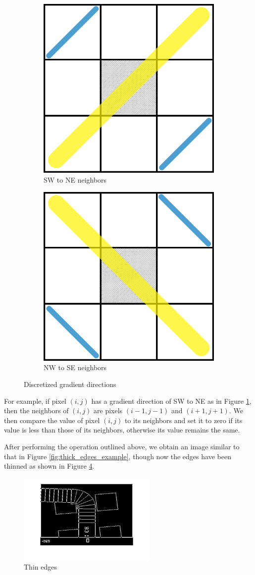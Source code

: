 \begin{figure}[h!]
\centering
\begin{subfigure}{.5\textwidth}
  \centering
  \includegraphics[width=.4\linewidth]{Graphics/disc_grad_dir_diag_1.png}
  \caption{SW to NE neighbors}
  \label{fig:disc_grad_dir_diag_1}
\end{subfigure}%
\begin{subfigure}{.5\textwidth}
  \centering
  \includegraphics[width=.4\linewidth]{Graphics/disc_grad_dir_diag_2.png}
  \caption{NW to SE neighbors}
  \label{fig:disc_grad_dir_diag_2}
\end{subfigure}
\caption{Discretized gradient directions}
\label{fig:disc_grad_dir_neighbors_2}
\end{figure}

For example, if pixel $(i,j)$ has a gradient direction of SW to NE
as in Figure \ref{fig:disc_grad_dir_diag_1}, then the
neighbors of $(i,j)$ are pixels $(i-1,j-1)$ and $(i+1,j+1)$. We then
compare the value of pixel $(i,j)$ to its neighbors and set it to zero
if its value is less than those of its neighbors, otherwise its value
remains the same. 

After performing the operation outlined above, we obtain an image
similar to that in Figure \ref{fig:thick_edges_example}, though
now the edges have been thinned as shown in Figure 
\ref{fig:thin_edges_example}.

\begin{figure}[h!]
\centering
\includegraphics[width=0.6\textwidth]{Graphics/thinned_edges_example.png}
\caption{Thin edges}
\label{fig:thin_edges_example}
\end{figure}

